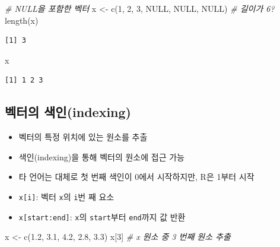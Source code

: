 \documentclass[
  11pt,
]{krantz}
\newenvironment{Shaded}{\begin{snugshade}}{\end{snugshade}}
\newcommand{\CommentTok}[1]{\textcolor[rgb]{0.37,0.37,0.37}{\textit{#1}}}
\newcommand{\ConstantTok}[1]{\textcolor[rgb]{0,0,0}{#1}}
\newcommand{\DecValTok}[1]{\textcolor[rgb]{0.06,0.06,0.06}{#1}}
\newcommand{\FloatTok}[1]{\textcolor[rgb]{0.06,0.06,0.06}{#1}}
\newcommand{\FunctionTok}[1]{\textcolor[rgb]{0,0,0}{#1}}
\newcommand{\NormalTok}[1]{#1}
\newcommand{\OtherTok}[1]{\textcolor[rgb]{0.37,0.37,0.37}{#1}}
\providecommand{\tightlist}{%
  \setlength{\itemsep}{0pt}\setlength{\parskip}{0pt}}
\begin{document}
\begin{Shaded}
\begin{Highlighting}[]
\CommentTok{\# NULL을 포함한 벡터 }
\NormalTok{x }\OtherTok{\textless{}{-}} \FunctionTok{c}\NormalTok{(}\DecValTok{1}\NormalTok{, }\DecValTok{2}\NormalTok{, }\DecValTok{3}\NormalTok{, }\ConstantTok{NULL}\NormalTok{, }\ConstantTok{NULL}\NormalTok{, }\ConstantTok{NULL}\NormalTok{) }\CommentTok{\# 길이가 6?}
\FunctionTok{length}\NormalTok{(x)}
\end{Highlighting}
\end{Shaded}

\begin{verbatim}
[1] 3
\end{verbatim}

\begin{Shaded}
\begin{Highlighting}[]
\NormalTok{x}
\end{Highlighting}
\end{Shaded}

\begin{verbatim}
[1] 1 2 3
\end{verbatim}

\normalsize

\hypertarget{vector-index}{%
\subsection{벡터의 색인(indexing)}\label{vector-index}}

\begin{itemize}
\tightlist
\item
  벡터의 특정 위치에 있는 원소를 추출\\
\item
  색인(indexing)을 통해 벡터의 원소에 접근 가능
\item
  타 언어는 대체로 첫 번째 색인이 0에서 시작하지만, R은 1부터 시작
\item
  \texttt{x{[}i{]}}: 벡터 \texttt{x}의 \texttt{i}번 째 요소
\item
  \texttt{x{[}start:end{]}}: \texttt{x}의 \texttt{start}부터 \texttt{end}까지 값 반환
\end{itemize}

\footnotesize

\begin{Shaded}
\begin{Highlighting}[]
\NormalTok{x }\OtherTok{\textless{}{-}} \FunctionTok{c}\NormalTok{(}\FloatTok{1.2}\NormalTok{, }\FloatTok{3.1}\NormalTok{, }\FloatTok{4.2}\NormalTok{, }\FloatTok{2.8}\NormalTok{, }\FloatTok{3.3}\NormalTok{)}
\NormalTok{x[}\DecValTok{3}\NormalTok{] }\CommentTok{\# x 원소 중 3 번째 원소 추출}
\end{Highlighting}
\end{Shaded}
\end{document}
